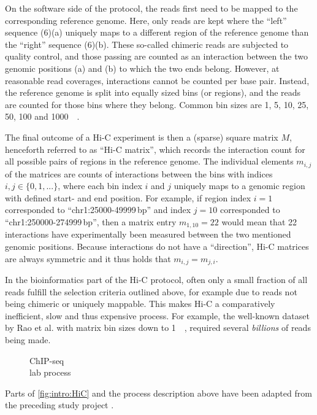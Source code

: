 On the software side of the protocol, the reads first need to be mapped 
to the corresponding reference genome.
Here, only reads are kept where the ``left'' sequence (6)(a)
uniquely maps to a different region of the reference genome than the ``right'' sequence (6)(b).
These so-called chimeric reads are subjected to quality control, and those passing are counted as an interaction
between the two genomic positions (a) and (b) to which the two ends belong.
However, at reasonable read coverages, interactions cannot be counted per base pair. 
Instead, the reference genome is split into equally sized bins (or regions), 
and the reads are counted for those bins where they belong. 
Common bin sizes are 1, 5, 10, 25, 50, 100 and \SI{1000}{\kilo\bp}.

The final outcome of a Hi-C experiment is then a (sparse) square matrix $M$, henceforth referred to as ``Hi-C matrix'', 
which records the interaction count for all possible pairs of regions in the reference genome.
The individual elements $m_{i,j}$ of the matrices are counts of interactions between the bins with indices $i,j \in \{0,1,...\}$,
where each bin index $i$ and $j$ uniquely maps to a genomic region with defined start- and end position.
For example, if region index $i=1$ corresponded to ``chr1:25000-49999\,bp'' and index $j=10$ corresponded to ``chr1:250000-274999\,bp'',
then a matrix entry $m_{1,10}=22$ would mean that 22 interactions have experimentally been measured between the two mentioned genomic positions.
Because interactions do not have a ``direction'', Hi-C matrices are always symmetric and it thus holds that $m_{i,j} = m_{j,i}$.

In the bioinformatics part of the Hi-C protocol, often only a small fraction of all reads 
fulfill the selection criteria outlined above, for example due to reads not being chimeric or uniquely mappable.
This makes Hi-C a comparatively inefficient, slow and thus expensive process.
For example, the well-known dataset by Rao et al. \cite{Rao2014} with matrix bin sizes down to \SI{1}{\kilo\bp}, required several \emph{billions} of reads being made. 

\begin{wrapfigure}[28]{r}{0.3\textwidth}
 \vspace{-4mm}
 \caption[ChIP-seq lab process]{ChIP-seq\\lab process}
 \label{fig:intro:chipseq1}
\end{wrapfigure}
Parts of \cref{fig:intro:HiC} and the process description above 
have been adapted from the preceding study project \cite{Krauth2020}.


